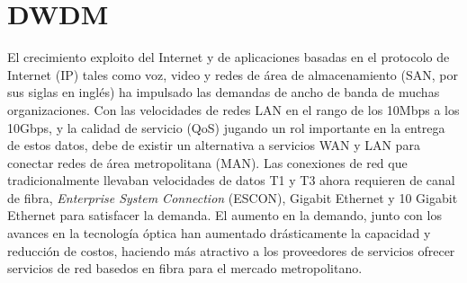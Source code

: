 \documentclass[10pt,journal,compsoc]{IEEEtran}
\begin{document}


\section{DWDM}
El crecimiento exploito del Internet y de aplicaciones basadas en el protocolo de Internet (IP) tales como voz, video y redes de área de almacenamiento (SAN, por sus siglas en inglés) ha impulsado las demandas de ancho de banda de muchas organizaciones. Con las velocidades de redes LAN en el rango de los 10Mbps a los 10Gbps, y la calidad de servicio (QoS) jugando un rol importante en la entrega de estos datos, debe de existir un alternativa a servicios WAN y LAN para conectar redes de área metropolitana (MAN). Las conexiones de red que tradicionalmente llevaban velocidades de datos \textsc{T1} y \textsc{T3} ahora requieren de canal de fibra, \emph{Enterprise System Connection} (ESCON), Gigabit Ethernet y 10 Gigabit Ethernet para satisfacer la demanda. El aumento en la demando, junto con los avances en la tecnología óptica han aumentado drásticamente la capacidad y reducción de costos, haciendo más atractivo a los proveedores de servicios ofrecer servicios de red basedos en fibra para el mercado metropolitano. 
\end{document}
